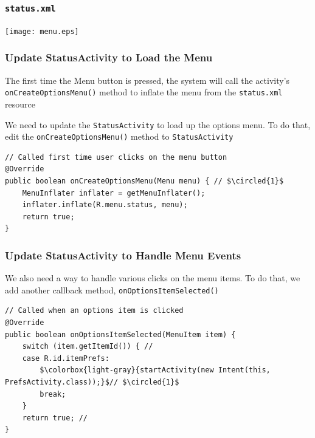 \begin{frame}
\frametitle{\texttt{status.xml}}

\centering
\texttt{[image: menu.eps]}
\end{frame}
\begin{frame}[containsverbatim]
\frametitle{Update StatusActivity to Load the Menu}

The first time the Menu button is pressed, the system will call
the activity’s \texttt{onCreateOptionsMenu()} method to inflate the menu from the \texttt{status.xml}
resource

We need to update the \texttt{StatusActivity} to load up the options menu. To do that, edit
the \texttt{onCreateOptionsMenu()} method to \texttt{StatusActivity}

\lstset{language=java, style=eclipse}
\begin{adjustbox}{width=1.0 \textwidth}
\begin{lstlisting}[caption=src/com.artemisa.yamba/StatusActivity.java, basicstyle=\scriptsize,escapechar=$]
// Called first time user clicks on the menu button
@Override
public boolean onCreateOptionsMenu(Menu menu) { // $\circled{1}$
	MenuInflater inflater = getMenuInflater(); 
	inflater.inflate(R.menu.status, menu);
	return true; 
}
\end{lstlisting}
\end{adjustbox}


\end{frame}
\begin{frame}[containsverbatim]
\frametitle{Update StatusActivity to Handle Menu Events}

We also need a way to handle various clicks on the menu items. To do that, we add
another callback method, \texttt{onOptionsItemSelected()}

\lstset{language=java, style=eclipse}
\begin{adjustbox}{width=0.90 \textwidth}
\begin{lstlisting}[caption=src/com.artemisa.yamba/StatusActivity.java, basicstyle=\scriptsize,escapechar=$]
// Called when an options item is clicked
@Override
public boolean onOptionsItemSelected(MenuItem item) {
	switch (item.getItemId()) { //
	case R.id.itemPrefs:
		$\colorbox{light-gray}{startActivity(new Intent(this, PrefsActivity.class));}$// $\circled{1}$
		break;
	}
	return true; //
}

\end{lstlisting}
\end{adjustbox}
\end{frame}
